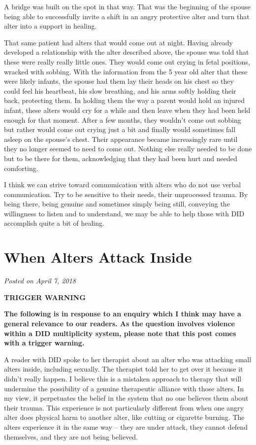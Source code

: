 \documentclass[]{book}
\begin{document}
A bridge was built on the spot in that way. That was the beginning of the spouse being able to successfully invite a shift in an angry protective alter and turn that alter into a support in healing.

That same patient had alters that would come out at night. Having already developed a relationship with the alter described above, the spouse was told that these were really really little ones. They would come out crying in fetal positions, wracked with sobbing. With the information from the 5 year old alter that these were likely infants, the spouse had them lay their heads on his chest so they could feel his heartbeat, his slow breathing, and his arms softly holding their back, protecting them. In holding them the way a parent would hold an injured infant, these alters would cry for a while and then leave when they had been held enough for that moment. After a few months, they wouldn't come out sobbing but rather would come out crying just a bit and finally would sometimes fall asleep on the spouse's chest. Their appearance became increasingly rare until they no longer seemed to need to come out. Nothing else really needed to be done but to be there for them, acknowledging that they had been hurt and needed comforting.

I think we can strive toward communication with alters who do not use verbal communication. Try to be sensitive to their needs, their unprocessed trauma. By being there, being genuine and sometimes simply being still, conveying the willingness to listen and to understand, we may be able to help those with DID accomplish quite a bit of healing.

\hypertarget{when-alters-attack-inside}{%
\section{When Alters Attack Inside}\label{when-alters-attack-inside}}

\emph{Posted on April 7, 2018}

\textbf{TRIGGER WARNING}

\textbf{The following is in response to an enquiry which I think may have a general relevance to our readers. As the question involves violence within a DID multiplicity system, please note that this post comes with a trigger warning.}

A reader with DID spoke to her therapist about an alter who was attacking small alters inside, including sexually. The therapist told her to get over it because it didn't really happen. I believe this is a mistaken approach to therapy that will undermine the possibility of a genuine therapeutic alliance with those alters. In my view, it perpetuates the belief in the system that no one believes them about their trauma. This experience is not particularly different from when one angry alter does physical harm to another alter, like cutting or cigarette burning. The alters experience it in the same way -- they are under attack, they cannot defend themselves, and they are not being believed.
\end{document}
